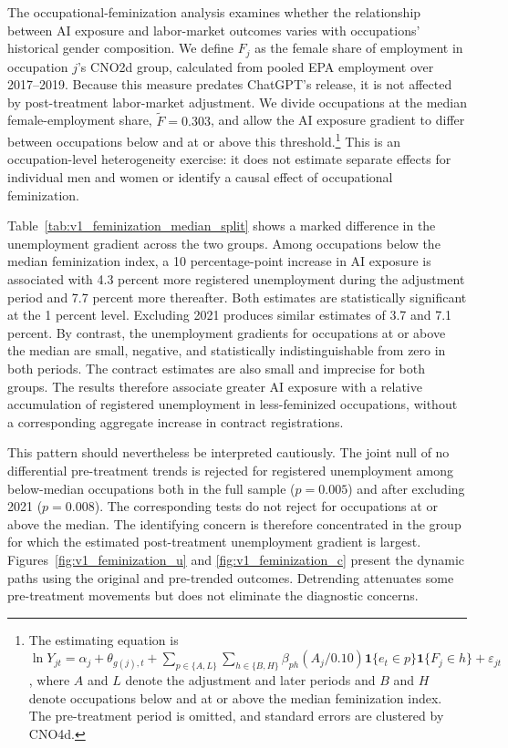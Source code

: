 The occupational-feminization analysis examines whether the relationship between AI exposure and labor-market outcomes varies with occupations' historical gender composition. We define \(F_j\) as the female share of employment in occupation \(j\)'s CNO2d group, calculated from pooled EPA employment over 2017--2019. Because this measure predates ChatGPT's release, it is not affected by post-treatment labor-market adjustment. We divide occupations at the median female-employment share, \(\widetilde F=0.303\), and allow the AI exposure gradient to differ between occupations below and at or above this threshold.\footnote{The estimating equation is \(\ln Y_{jt}=\alpha_j+\theta_{g(j),t}+\sum_{p\in\{A,L\}}\sum_{h\in\{B,H\}}\beta_{ph}(A_j/0.10)\mathbf{1}\{e_t\in p\}\mathbf{1}\{F_j\in h\}+\varepsilon_{jt}\), where \(A\) and \(L\) denote the adjustment and later periods and \(B\) and \(H\) denote occupations below and at or above the median feminization index. The pre-treatment period is omitted, and standard errors are clustered by CNO4d.} This is an occupation-level heterogeneity exercise: it does not estimate separate effects for individual men and women or identify a causal effect of occupational feminization.



Table~\ref{tab:v1_feminization_median_split} shows a marked difference in the unemployment gradient across the two groups. Among occupations below the median feminization index, a 10 percentage-point increase in AI exposure is associated with 4.3 percent more registered unemployment during the adjustment period and 7.7 percent more thereafter. Both estimates are statistically significant at the 1 percent level. Excluding 2021 produces similar estimates of 3.7 and 7.1 percent. By contrast, the unemployment gradients for occupations at or above the median are small, negative, and statistically indistinguishable from zero in both periods. The contract estimates are also small and imprecise for both groups. The results therefore associate greater AI exposure with a relative accumulation of registered unemployment in less-feminized occupations, without a corresponding aggregate increase in contract registrations.

This pattern should nevertheless be interpreted cautiously. The joint null of no differential pre-treatment trends is rejected for registered unemployment among below-median occupations both in the full sample (\(p=0.005\)) and after excluding 2021 (\(p=0.008\)). The corresponding tests do not reject for occupations at or above the median. The identifying concern is therefore concentrated in the group for which the estimated post-treatment unemployment gradient is largest. Figures~\ref{fig:v1_feminization_u} and \ref{fig:v1_feminization_c} present the dynamic paths using the original and pre-trended outcomes. Detrending attenuates some pre-treatment movements but does not eliminate the diagnostic concerns.

